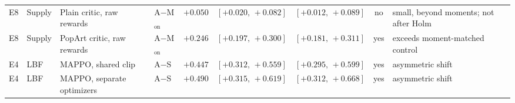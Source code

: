 \begin{table}[!htbp]
\begin{tabular}{@{}ll>{\raggedright\arraybackslash}p{}lcccc >{\raggedright\arraybackslash}p{}@{}}
E8 & Supply & Plain critic, raw rewards & A$-$M$_{\mathrm{on}}$ & $+0.050$ & $[+0.020,\,+0.082]$ & $[+0.012,\,+0.089]$ & no & small, beyond moments; not after Holm \\
E8 & Supply & PopArt critic, raw rewards & A$-$M$_{\mathrm{on}}$ & $+0.246$ & $[+0.197,\,+0.300]$ & $[+0.181,\,+0.311]$ & yes & exceeds moment-matched control \\
E4 & LBF & MAPPO, shared clip & A$-$S & $+0.447$ & $[+0.312,\,+0.559]$ & $[+0.295,\,+0.599]$ & yes & asymmetric shift \\
E4 & LBF & MAPPO, separate optimizers & A$-$S & $+0.490$ & $[+0.315,\,+0.619]$ & $[+0.312,\,+0.668]$ & yes & asymmetric shift \\
\bottomrule
\end{tabular}
\end{table}
